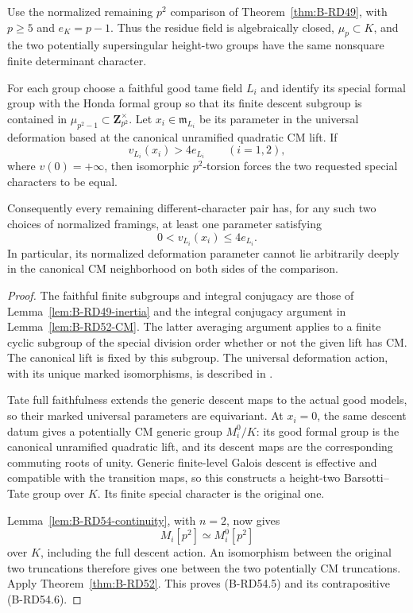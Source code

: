\begin{proposition}
\label{prop:B-RD54-neighborhood}
Use the normalized remaining $p^2$ comparison of
Theorem~\ref{thm:B-RD49}, with $p\ge5$ and $e_K=p-1$.
Thus the residue field is algebraically closed, $\mu_p\subset K$,
and the two potentially supersingular height-two groups have
the same nonsquare finite determinant character.

For each group choose a faithful good tame field $L_i$ and
identify its special formal group with the Honda formal group
so that its finite descent subgroup is contained in
$\mu_{p^2-1}\subset\mathbf Z_{p^2}^{\times}$.
Let $x_i\in\mathfrak m_{L_i}$ be its parameter in the universal
deformation based at the canonical unramified quadratic CM lift.
If
\[
                   v_{L_i}(x_i)>4e_{L_i}
                         \qquad(i=1,2),                \tag{B-RD54.5}
\]
where $v(0)=+\infty$, then isomorphic $p^2$-torsion forces
the two requested special characters to be equal.

Consequently every remaining different-character pair has,
for any such two choices of normalized framings, at least one
parameter satisfying
\[
                       0<v_{L_i}(x_i)\le4e_{L_i}.
                                                        \tag{B-RD54.6}
\]
In particular, its normalized deformation parameter cannot
lie arbitrarily deeply in the canonical CM neighborhood on
both sides of the comparison.
\end{proposition}
\begin{proof}
The faithful finite subgroups and integral conjugacy are those
of Lemma~\ref{lem:B-RD49-inertia} and the integral conjugacy
argument in Lemma~\ref{lem:B-RD52-CM}. The latter averaging
argument applies to a finite cyclic subgroup of the special
division order whether or not the given lift has CM.
The canonical lift is fixed by this subgroup. The universal
deformation action, with its unique marked isomorphisms, is
described in
\cite[Propositions~12.10, 14.7, 14.9 and~14.13]
{HopkinsGross1994Bundles}.

Tate full faithfulness extends the generic descent maps to the
actual good models, so their marked universal parameters are
equivariant. At $x_i=0$, the same descent datum gives a
potentially CM generic group $M_i^0/K$: its good formal group
is the canonical unramified quadratic lift, and its descent
maps are the corresponding commuting roots of unity. Generic
finite-level Galois descent is effective and compatible with
the transition maps, so this constructs a height-two
Barsotti--Tate group over $K$. Its finite special character is
the original one.

Lemma~\ref{lem:B-RD54-continuity}, with $n=2$, now gives
\[
                      M_i[p^2]\simeq M_i^0[p^2]
\]
over $K$, including the full descent action. An isomorphism
between the original two truncations therefore gives one
between the two potentially CM truncations. Apply
Theorem~\ref{thm:B-RD52}. This proves (B-RD54.5) and its
contrapositive (B-RD54.6).
\end{proof}

